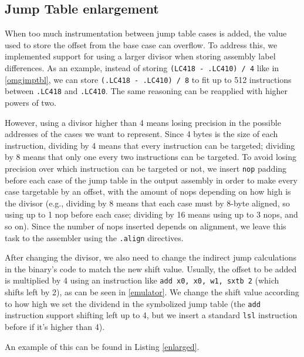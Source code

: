 \documentclass[a4paper,11pt,oneside]{report}
\begin{document}
\subsection{Jump Table enlargement}

When too much instrumentation between jump table cases is added, the value used
to store the offset from the base case can overflow. To address this, we
implemented support for using a larger divisor when storing assembly label
differences.  As an example, instead of storing \texttt{(LC418 - .LC410) / 4}
like in \autoref{omgjmptbl}, we can store \texttt{(.LC418 - .LC410) / 8} to fit
up to 512 instructions between \texttt{.LC418} and \texttt{.LC410}. The same reasoning
can be reapplied with higher powers of two. 

However, using a divisor higher than 4 means losing precision in the possible
addresses of the cases we want to represent. Since 4 bytes is the size of each
instruction, dividing by 4 means that every instruction can be targeted;
dividing by 8 means that only one every two instructions can be targeted. To
avoid losing precision over which instruction can be targeted or not, we insert
\texttt{nop} padding before each case of the jump table in the output assembly
in order to make every case targetable by an offset, with the amount of nops
depending on how high is the divisor (e.g., dividing by 8 means that each case
must by 8-byte aligned, so using up to 1 nop before each case; dividing by 16
means using up to 3 nops, and so on). Since the number of nops inserted depends on 
alignment, we leave this task to the assembler using the \texttt{.align} directives.

After changing the divisor, we also need to change the indirect jump calculations in the
binary's code to match the new shift value. Usually, the offset to be added is multiplied by
4 using an instruction like \texttt{add x0, x0, w1, sxtb 2} (which shifts left by 2), as
can be seen in \autoref{emulator}. We change the shift value according to how high we set
the dividend in the symbolized jump table (the \texttt{add} instruction support shifting left
up to 4, but we insert a standard \texttt{lsl} instruction before if it's higher than 4). 

An example of this can be found in Listing \ref{enlarged}.
\end{document}
